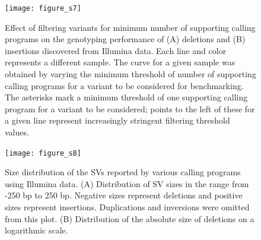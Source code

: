 \documentclass[12pt]{article}
\newenvironment{cfigure}
	{\begin{figure} \centering}
	{\end{figure}}
\begin{document}
\begin{cfigure}
	\texttt{[image: figure\_s7]}

	\caption[Effect of the number of supporting calling programs on genotyping performance of Illumina deletions and insertions]{
		Effect of filtering variants for minimum number of supporting calling programs on the genotyping performance of (A) deletions and (B) insertions discovered from Illumina data.
		Each line and color represents a different sample.
		The curve for a given sample was obtained by varying the minimum threshold of number of supporting calling programs for a variant to be considered for benchmarking.
		The asterisks mark a minimum threshold of one supporting calling program for a variant to be considered; points to the left of these for a given line represent increasingly stringent filtering threshold values.
		}

	\label{fig_s7}

\end{cfigure}

\clearpage%

\begin{cfigure}
	\texttt{[image: figure\_s8]}

	\caption[Size distribution of the SVs reported by various calling programs using Illumina data]{
		Size distribution of the SVs reported by various calling programs using Illumina data.
		(A) Distribution of SV sizes in the range from -250 bp to 250 bp.
		Negative sizes represent deletions and positive sizes represent insertions.
		Duplications and inversions were omitted from this plot.
		(B) Distribution of the absolute size of deletions on a logarithmic scale.
	}

	\label{fig_s8}

\end{cfigure}

\clearpage%
\end{document}
